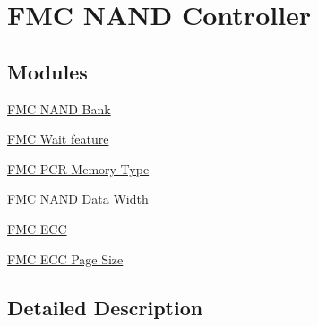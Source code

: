 \hypertarget{group___f_m_c___l_l___n_a_n_d___controller}{}\section{F\+MC N\+A\+ND Controller}
\label{group___f_m_c___l_l___n_a_n_d___controller}
\subsection*{Modules}
\begin{DoxyCompactItemize}
\item 
\hyperlink{group___f_m_c___n_a_n_d___bank}{F\+M\+C N\+A\+N\+D Bank}
\item 
\hyperlink{group___f_m_c___wait__feature}{F\+M\+C Wait feature}
\item 
\hyperlink{group___f_m_c___p_c_r___memory___type}{F\+M\+C P\+C\+R Memory Type}
\item 
\hyperlink{group___f_m_c___n_a_n_d___data___width}{F\+M\+C N\+A\+N\+D Data Width}
\item 
\hyperlink{group___f_m_c___e_c_c}{F\+M\+C E\+CC}
\item 
\hyperlink{group___f_m_c___e_c_c___page___size}{F\+M\+C E\+C\+C Page Size}
\end{DoxyCompactItemize}


\subsection{Detailed Description}
